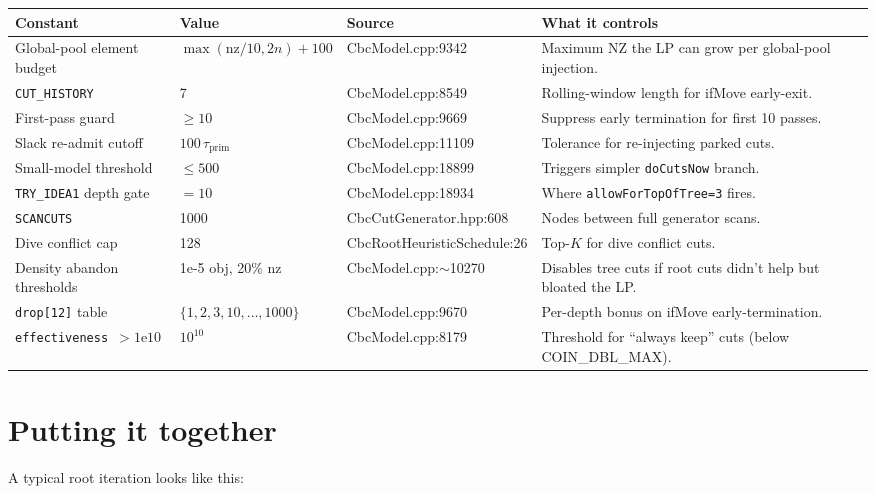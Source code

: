\documentclass[11pt,a4paper]{article}
\begin{document}
\begin{longtable}{p{4.0cm}p{2.5cm}p{2.5cm}p{5.5cm}}
\toprule
\textbf{Constant} & \textbf{Value} & \textbf{Source} &
\textbf{What it controls}\\
\midrule
\endhead
Global-pool element budget & $\max(\text{nz}/10,2n)+100$ &
  CbcModel.cpp:9342 & Maximum NZ the LP can grow per global-pool
  injection.\\
\texttt{CUT\_HISTORY} & 7 & CbcModel.cpp:8549 & Rolling-window
  length for ifMove early-exit.\\
First-pass guard & $\ge 10$ & CbcModel.cpp:9669 & Suppress early
  termination for first 10 passes.\\
Slack re-admit cutoff & $100\,\tau_{\text{prim}}$ &
  CbcModel.cpp:11109 & Tolerance for re-injecting parked cuts.\\
Small-model threshold & $\le 500$ & CbcModel.cpp:18899 & Triggers
  simpler \texttt{doCutsNow} branch.\\
\texttt{TRY\_IDEA1} depth gate & $=10$ & CbcModel.cpp:18934 &
  Where \texttt{allowForTopOfTree=3} fires.\\
\texttt{SCANCUTS} & 1000 & CbcCutGenerator.hpp:608 & Nodes
  between full generator scans.\\
Dive conflict cap & 128 & CbcRootHeuristicSchedule:26 & Top-$K$
  for dive conflict cuts.\\
Density abandon thresholds & 1e-5 obj, 20\% nz &
  CbcModel.cpp:$\sim$10270 & Disables tree cuts if root cuts
  didn't help but bloated the LP.\\
\texttt{drop[12]} table & $\{1,2,3,10,\dots,1000\}$ &
  CbcModel.cpp:9670 & Per-depth bonus on ifMove
  early-termination.\\
\texttt{effectiveness $> 1\mathrm{e}10$} & $10^{10}$ &
  CbcModel.cpp:8179 & Threshold for ``always keep'' cuts
  (below COIN\_DBL\_MAX).\\
\bottomrule
\end{longtable}

\section{Putting it together}

A typical root iteration looks like this:
\end{document}
